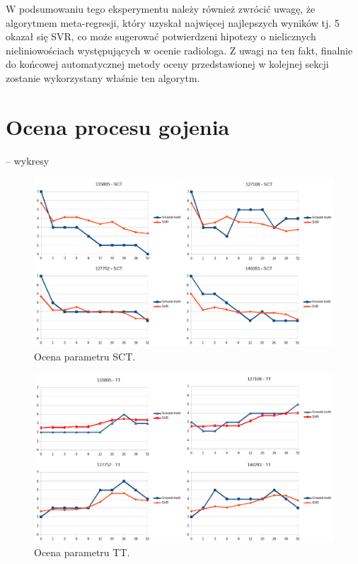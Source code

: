 W podsumowaniu tego eksperymentu należy również zwrócić uwagę, że algorytmem meta-regresji, który uzyskał najwięcej najlepszych wyników tj. 5 okazał się SVR, co może sugerować potwierdzeni hipotezy o nielicznych nieliniowościach występujących w ocenie radiologa. Z uwagi na ten fakt, finalnie do końcowej automatycznej metody oceny przedstawionej w kolejnej sekcji zostanie wykorzystany właśnie ten algorytm.

\section{Ocena procesu gojenia}

-- wykresy

\begin{figure}[h]
	\centering
	\includegraphics[width=1\textwidth]{figures/SCT.png}
	\caption{Ocena parametru SCT.}\label{fig:SCT}
\end{figure}

\begin{figure}[h]
	\centering
	\includegraphics[width=1\textwidth]{figures/TT.png}
	\caption{Ocena parametru TT.}\label{fig:TT}
\end{figure}

